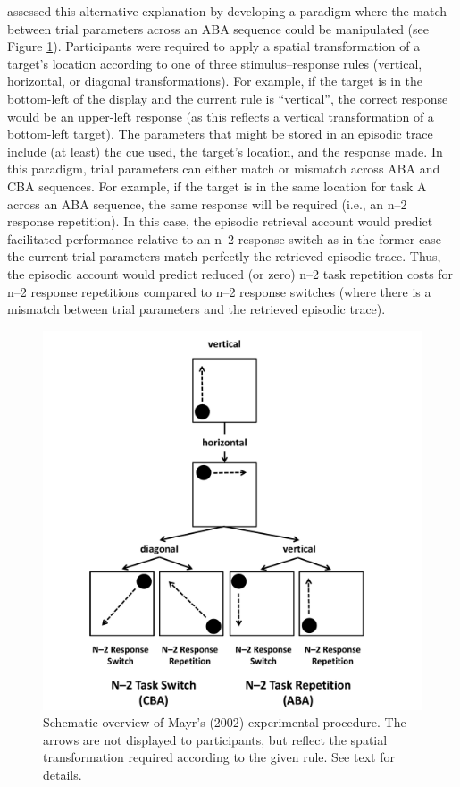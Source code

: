 \documentclass[a4paper, man, natbib]{apa6}
\begin{document}
\cite{Mayr2002} assessed this alternative explanation by developing a paradigm where the match between trial parameters across an ABA sequence could be manipulated (see Figure \ref{fig:mayrExperiment}). Participants were required to apply a spatial transformation of a target's location according to one of three stimulus--response rules (vertical, horizontal, or diagonal transformations). For example, if the target is in the bottom-left of the display and the current rule is ``vertical'', the correct response would be an upper-left response (as this reflects a vertical transformation of a bottom-left target). The parameters that might be stored in an episodic trace include (at least) the cue used, the target's location, and the response made. In this paradigm, trial parameters can either match or mismatch across ABA and CBA sequences. For example, if the target is in the same location for task A across an ABA sequence, the same response will be required (i.e., an n--2 response repetition). In this case, the episodic retrieval account would predict facilitated performance relative to an n--2 response switch as in the former case the current trial parameters match perfectly the retrieved episodic trace. Thus, the episodic account would predict reduced (or zero) n--2 task repetition costs for n--2 response repetitions compared to n--2 response switches (where there is a mismatch between trial parameters and the retrieved episodic trace).

\begin{figure}
\begin{center}
\includegraphics[width = \textwidth]{Images/mayrExperiment.pdf}
\caption{Schematic overview of Mayr's (2002) experimental procedure. The arrows are not displayed to participants, but reflect the spatial transformation required according to the given rule. See text for details.}
\label{fig:mayrExperiment}
\end{center}
\end{figure}
\end{document}
